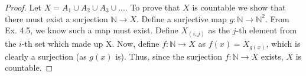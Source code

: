 \documentclass{article}
\theoremstyle{remark}
\begin{document}
\begin{proof}

    Let $X = A_1 \cup A_2 \cup A_3 \cup ...$. To prove that $X$ is countable we show that there must exist
    a surjection $\mathbb{N} \rightarrow X$. Define a surjective map $g: \mathbb{N} \rightarrow \mathbb{N}^2$.
    From Ex. 4.5, we know such a map must exist. Define $X_{(i, j)}$ as the $j$-th element from the
    $i$-th set which made up X. Now, define $f: \mathbb{N} \rightarrow X$ as $f(x) = X_{g(x)}$,
    which is clearly a surjection (as $g(x)$ is).
    Thus, since the surjection $f: \mathbb{N} \rightarrow X$ exists, $X$ is countable.
\end{proof}
\end{document}
